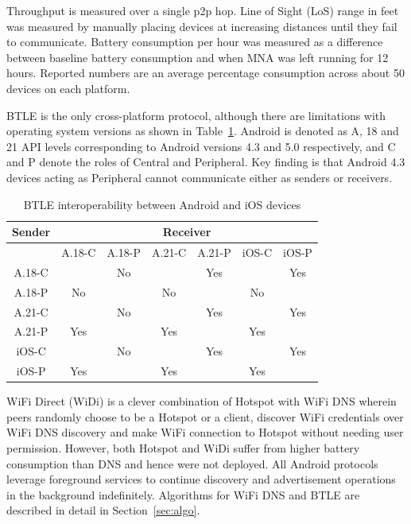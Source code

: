 \documentclass[conference]{IEEEtran}
\begin{document}
Throughput is measured over a single p2p hop. Line of Sight (LoS)
range in feet was measured by manually placing devices at increasing
distances until they fail to communicate. Battery consumption per hour
was measured as a difference between baseline battery consumption and
when MNA was left running for 12 hours. Reported numbers are an
average percentage consumption across about 50 devices on each
platform.

BTLE is the only cross-platform protocol, although there are
limitations with operating system versions as shown in
Table~\ref{tab:android_ios}. Android is denoted as A, 18 and 21 API
levels corresponding to Android versions 4.3 and 5.0 respectively, and
C and P denote the roles of Central and Peripheral. Key finding is
that Android 4.3 devices acting as Peripheral cannot communicate
either as senders or receivers.
%
\begin{table}[H]
\caption{BTLE interoperability between Android and iOS devices}
\label{tab:android_ios}
\centering
\begin{tabular}{|c|c|c|c|c|c|c|}
\hline 
\multicolumn{1}{|c|}{Sender} & \multicolumn{6}{c|}{Receiver} \\
\hline
\multicolumn{1}{|c|}{} & A.18-C & A.18-P & A.21-C & A.21-P  & iOS-C & iOS-P \\
\hline
A.18-C & \cellcolor{Gray}         &   No       & \cellcolor{Gray}         &    Yes       &  \cellcolor{Gray}       &   Yes      \\ 
\hline
A.18-P &  No        & \cellcolor{Gray}         &   No       &  \cellcolor{Gray}         &   No      &  \cellcolor{Gray}       \\ 
\hline
A.21-C & \cellcolor{Gray}         &   No       &  \cellcolor{Gray}        &    Yes       &  \cellcolor{Gray}       &   Yes      \\ 
\hline
A.21-P &  Yes        & \cellcolor{Gray}         &   Yes       &  \cellcolor{Gray}         &   Yes      & \cellcolor{Gray}        \\ 
\hline
iOS-C & \cellcolor{Gray}         &    No      &  \cellcolor{Gray}        &     Yes       & \cellcolor{Gray}        &   Yes      \\ 
\hline
iOS-P &   Yes       & \cellcolor{Gray}         &    Yes      &  \cellcolor{Gray}         &   Yes      &  \cellcolor{Gray}       \\ 
\hline
\end{tabular}
\end{table}
%

WiFi Direct (WiDi) is a clever combination of Hotspot with WiFi DNS
wherein peers randomly choose to be a Hotspot or a client, discover
WiFi credentials over WiFi DNS discovery and make WiFi connection to
Hotspot without needing user permission.  However, both Hotspot and
WiDi suffer from higher battery consumption than DNS and hence were
not deployed. All Android protocols leverage foreground services to
continue discovery and advertisement operations in the background
indefinitely. Algorithms for WiFi DNS and BTLE are described in detail
in Section~\ref{sec:algo}.
\end{document}
